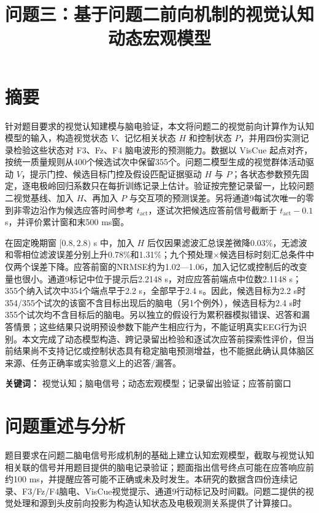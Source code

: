 \documentclass[UTF8,12pt,a4paper,fontset=windows]{ctexart}
\title{问题三：基于问题二前向机制的视觉认知动态宏观模型}
\author{}
\date{}
\begin{document}
\maketitle

\hypertarget{ux6458ux8981}{%
\section*{摘要}\label{ux6458ux8981}}

针对题目要求的视觉认知建模与脑电验证，本文将问题二的视觉前向计算作为认知模型的输入，构造视觉状态 \(V\)、记忆相关状态 \(H\) 和控制状态 \(P\)，并用四份实测记录检验这些状态对 F3、Fz、F4 脑电波形的预测能力。数据以 VisCue 起点对齐，按统一质量规则从400个候选试次中保留355个。问题二模型生成的视觉群体活动驱动 \(V\)，提示门控、候选目标门控及假设匹配证据驱动 \(H\) 与 \(P\)；各状态参数预先固定，逐电极岭回归系数只在每折训练记录上估计。验证按完整记录留一，比较问题二视觉基线、加入 \(H\)、再加入 \(P\) 与交互项的预测误差。另将通道9每试次唯一的零到非零边沿作为候选应答时间参考 \(t_{\mathrm{act}}\)，逐试次把候选应答前信号截断于 \(t_{\mathrm{act}}-0.1\) s，并评价累计窗和末500 ms窗。

在固定晚期窗 \([0.8,2.8)\) s 中，加入 \(H\) 后仅因果滤波汇总误差微降0.03\%，无滤波和零相位滤波误差分别上升0.78\%和1.31\%；九个预处理×候选目标时刻汇总条件中仅两个误差下降。应答前窗的NRMSE约为1.02---1.06，加入记忆或控制后的改变量也很小。通道9标记中位于提示后2.2148 s，对应应答前端点中位数2.1148 s；355个纳入试次中354个端点早于2.2 s，全部早于2.4 s。因此，候选目标为2.2 s时354/355个试次的该窗不含目标出现后的脑电（另1个例外），候选目标为2.4 s时355个试次均不含目标后的脑电。另以独立的假设行为累积器模拟错误、迟答和漏答情景；这些结果只说明预设参数下能产生相应行为，不能证明真实EEG行为识别。本文完成了动态模型构造、跨记录留出检验和逐试次应答前探索性评价，但当前结果尚不支持记忆或控制状态具有稳定脑电预测增益，也不能据此确认具体脑区来源、任务正确率或实验意义上的迟答/漏答。

\textbf{关键词：} 视觉认知；脑电信号；动态宏观模型；记录留出验证；应答前窗口

\clearpage
\tableofcontents
\clearpage

\hypertarget{ux95eeux9898ux91cdux8ff0ux4e0eux5206ux6790}{%
\section{问题重述与分析}\label{ux95eeux9898ux91cdux8ff0ux4e0eux5206ux6790}}

题目要求在问题二脑电信号形成机制的基础上建立认知宏观模型，截取与视觉认知相关联的信号并用题目提供的脑电记录验证；题面指出信号终点可能在应答响应前约100 ms，并提醒应答可能不正确或未及时发生\cite{problem2026}。本研究的数据含四份连续记录、F3/Fz/F4脑电、VisCue视觉提示、通道9行动标记及时间戳。问题二提供的视觉处理和源到头皮前向投影为构造认知状态及电极观测关系提供了计算接口。
\end{document}
